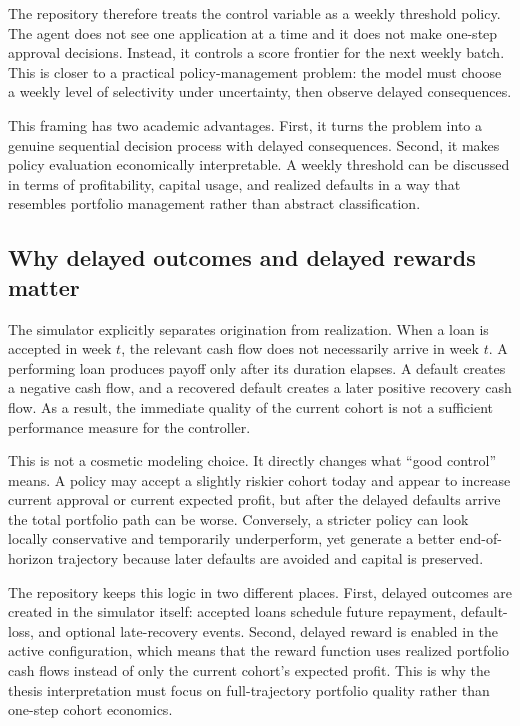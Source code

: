 \documentclass[12pt,a4paper]{article}
\begin{document}
The repository therefore treats the control variable as a weekly threshold policy. The agent does not see one application at a time and it does not make one-step approval decisions. Instead, it controls a score frontier for the next weekly batch. This is closer to a practical policy-management problem: the model must choose a weekly level of selectivity under uncertainty, then observe delayed consequences.

This framing has two academic advantages. First, it turns the problem into a genuine sequential decision process with delayed consequences. Second, it makes policy evaluation economically interpretable. A weekly threshold can be discussed in terms of profitability, capital usage, and realized defaults in a way that resembles portfolio management rather than abstract classification.

\subsection{Why delayed outcomes and delayed rewards matter}

The simulator explicitly separates origination from realization. When a loan is accepted in week $t$, the relevant cash flow does not necessarily arrive in week $t$. A performing loan produces payoff only after its duration elapses. A default creates a negative cash flow, and a recovered default creates a later positive recovery cash flow. As a result, the immediate quality of the current cohort is not a sufficient performance measure for the controller.

This is not a cosmetic modeling choice. It directly changes what ``good control'' means. A policy may accept a slightly riskier cohort today and appear to increase current approval or current expected profit, but after the delayed defaults arrive the total portfolio path can be worse. Conversely, a stricter policy can look locally conservative and temporarily underperform, yet generate a better end-of-horizon trajectory because later defaults are avoided and capital is preserved.

The repository keeps this logic in two different places. First, delayed outcomes are created in the simulator itself: accepted loans schedule future repayment, default-loss, and optional late-recovery events. Second, delayed reward is enabled in the active configuration, which means that the reward function uses realized portfolio cash flows instead of only the current cohort's expected profit. This is why the thesis interpretation must focus on full-trajectory portfolio quality rather than one-step cohort economics.
\end{document}
